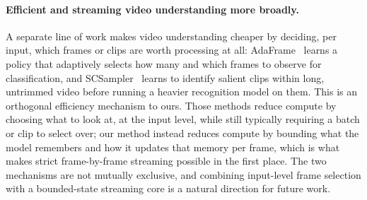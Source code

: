 \paragraph{Efficient and streaming video understanding more broadly.}
A separate line of work makes video understanding cheaper by deciding, per input, which frames or clips are worth processing at all: AdaFrame~\cite{wu2019adaframe} learns a policy that adaptively selects how many and which frames to observe for classification, and SCSampler~\cite{korbar2019scsampler} learns to identify salient clips within long, untrimmed video before running a heavier recognition model on them. This is an orthogonal efficiency mechanism to ours. Those methods reduce compute by choosing what to look at, at the input level, while still typically requiring a batch or clip to select over; our method instead reduces compute by bounding what the model remembers and how it updates that memory per frame, which is what makes strict frame-by-frame streaming possible in the first place. The two mechanisms are not mutually exclusive, and combining input-level frame selection with a bounded-state streaming core is a natural direction for future work.
